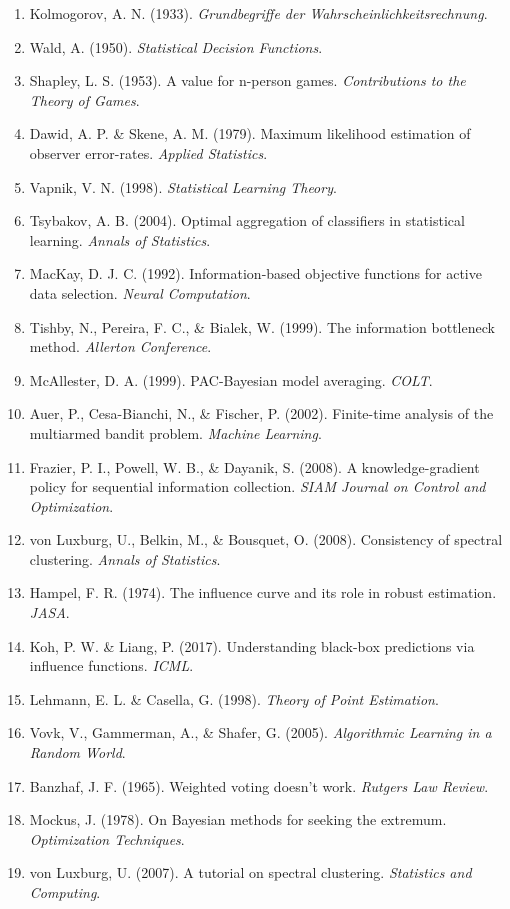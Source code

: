 \documentclass[
  12pt,
]{article}
\providecommand{\tightlist}{%
  \setlength{\itemsep}{0pt}\setlength{\parskip}{0pt}}
\begin{document}
\begin{enumerate}
\def\labelenumi{\arabic{enumi}.}
\tightlist
\item
  Kolmogorov, A. N. (1933). \emph{Grundbegriffe der
  Wahrscheinlichkeitsrechnung}.
\item
  Wald, A. (1950). \emph{Statistical Decision Functions}.
\item
  Shapley, L. S. (1953). A value for n-person games. \emph{Contributions
  to the Theory of Games}.
\item
  Dawid, A. P. \& Skene, A. M. (1979). Maximum likelihood estimation of
  observer error-rates. \emph{Applied Statistics}.
\item
  Vapnik, V. N. (1998). \emph{Statistical Learning Theory}.
\item
  Tsybakov, A. B. (2004). Optimal aggregation of classifiers in
  statistical learning. \emph{Annals of Statistics}.
\item
  MacKay, D. J. C. (1992). Information-based objective functions for
  active data selection. \emph{Neural Computation}.
\item
  Tishby, N., Pereira, F. C., \& Bialek, W. (1999). The information
  bottleneck method. \emph{Allerton Conference}.
\item
  McAllester, D. A. (1999). PAC-Bayesian model averaging. \emph{COLT}.
\item
  Auer, P., Cesa-Bianchi, N., \& Fischer, P. (2002). Finite-time
  analysis of the multiarmed bandit problem. \emph{Machine Learning}.
\item
  Frazier, P. I., Powell, W. B., \& Dayanik, S. (2008). A
  knowledge-gradient policy for sequential information collection.
  \emph{SIAM Journal on Control and Optimization}.
\item
  von Luxburg, U., Belkin, M., \& Bousquet, O. (2008). Consistency of
  spectral clustering. \emph{Annals of Statistics}.
\item
  Hampel, F. R. (1974). The influence curve and its role in robust
  estimation. \emph{JASA}.
\item
  Koh, P. W. \& Liang, P. (2017). Understanding black-box predictions
  via influence functions. \emph{ICML}.
\item
  Lehmann, E. L. \& Casella, G. (1998). \emph{Theory of Point
  Estimation}.
\item
  Vovk, V., Gammerman, A., \& Shafer, G. (2005). \emph{Algorithmic
  Learning in a Random World}.
\item
  Banzhaf, J. F. (1965). Weighted voting doesn't work. \emph{Rutgers Law
  Review}.
\item
  Mockus, J. (1978). On Bayesian methods for seeking the extremum.
  \emph{Optimization Techniques}.
\item
  von Luxburg, U. (2007). A tutorial on spectral clustering.
  \emph{Statistics and Computing}.
\end{enumerate}
\end{document}
